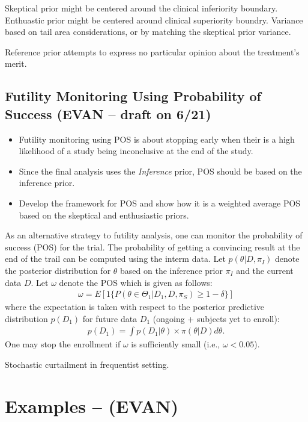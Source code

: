 \documentclass[12pt]{article}
\begin{document}
Skeptical prior might be centered around the clinical inferiority boundary.
Enthuastic prior might be centered around clinical superiority boundry.
Variance based on tail area considerations, or by matching the skeptical prior variance.

Reference prior attempts to express no particular opinion about the treatment's merit. 



\subsection{Futility Monitoring Using Probability of Success (EVAN -- draft on 6/21)}

\begin{itemize}
 \item Futility monitoring using POS is about stopping early when their is a high likelihood
       of a study being inconclusive at the end of the study.
 \item Since the final analysis uses the \textit{Inference} prior, POS should be based on the
       inference prior.
 \item Develop the framework for POS and show how it is a weighted average POS based on the skeptical
       and enthusiastic priors.
\end{itemize}
As an alternative strategy to futility analysis, one can monitor the probability of success (POS) for the trial. The probability of getting a convincing result at the end of the trail can be computed using the interm data. Let $p(\theta|D, \pi_{I})$ denote the posterior distribution for $\theta$ based on the inference prior $ \pi_{I}$ and the current data $D$. Let $\omega$ denote the POS which is given as follows:
\begin{align*}
\omega=E[1\{P(\theta\in\Theta_1|D_1,D, \pi_{S})\geq 1-\delta\}]
\end{align*}
where the expectation is taken with respect to the posterior predictive distribution $p(D_1)$ for future data $D_1$ (ongoing + subjects yet to enroll):
\begin{align*}
p(D_1)=\int p(D_1|\theta)\times \pi(\theta|D)d\theta.
\end{align*}
One may stop the enrollment if $\omega$ is sufficiently small (i.e., $\omega<0.05$).

Stochastic curtailment in frequentist setting.
\section{Examples -- (EVAN)}
\end{document}
